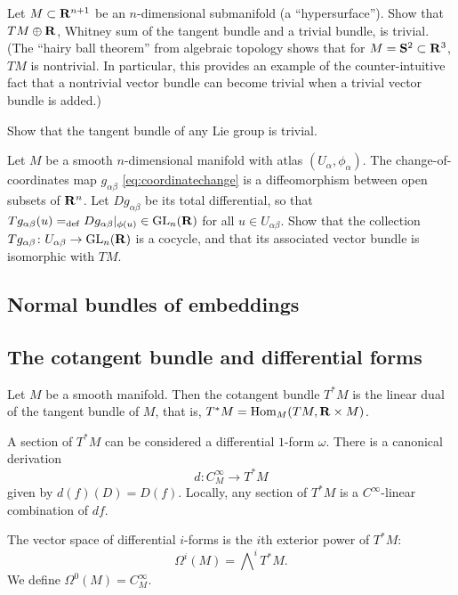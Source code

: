 \documentclass[a4paper,openany]{scrbook}
\begin{document}
\begin{exer}
Let $M \subset \mathbf R^{n+1}$ be an $n$-dimensional submanifold (a ``hypersurface''). Show that $TM \oplus \mathbf R$, Whitney sum of the tangent bundle and a trivial bundle, is trivial. (The ``hairy ball theorem'' from algebraic topology \cite{hatcher:AT} shows that for $M=\mathbf S^2 \subset \mathbf R^3$, $TM$ is nontrivial. In particular, this provides an example of the counter-intuitive fact that a nontrivial vector bundle can become trivial when a trivial vector bundle is added.)
\end{exer}

\begin{exer}
Show that the tangent bundle of any Lie group is trivial.
\end{exer}

\begin{exer}
Let $M$ be a smooth $n$-dimensional manifold with atlas $(U_\alpha,\phi_\alpha)$. The change-of-coordinates map $g_{\alpha\beta}$ \eqref{eq:coordinatechange} is a diffeomorphism between open subsets of $\mathbf R^n$. Let $Dg_{\alpha\beta}$ be its total differential, so that $Tg_{\alpha\beta}(u) =_{\operatorname{def}} Dg_{\alpha\beta}|_{\phi(u)} \in \operatorname{GL}_n(\mathbf R)$ for all $u \in U_{\alpha\beta}$. Show that the collection $Tg_{\alpha\beta}\colon U_{\alpha\beta} \to \operatorname{GL}_n(\mathbf R)$ is a cocycle, and that its associated vector bundle is isomorphic with $TM$.
\end{exer}

\subsection{Normal bundles of embeddings}

\subsection{The cotangent bundle and differential forms}

Let $M$ be a smooth manifold. Then the cotangent bundle $T^*M$ is the linear dual of the tangent bundle of $M$, that is, $T^*M = \operatorname{Hom}_M(TM,\mathbf R \times M)$.

A section of $T^*M$ can be considered a differential $1$-form $\omega$. There is a canonical derivation
\[
d\colon C^\infty_M \to T^*M 
\]
given by $d(f)(D) = D(f)$. Locally, any section of $T^*M$ is a $C^\infty$-linear combination of $df$.

The vector space of differential $i$-forms is the $i$th exterior power of $T^*M$:
\[
\Omega^i(M) = \bigwedge\nolimits^i T^*M.
\]
We define $\Omega^0(M) = C^\infty_M$.
\end{document}
